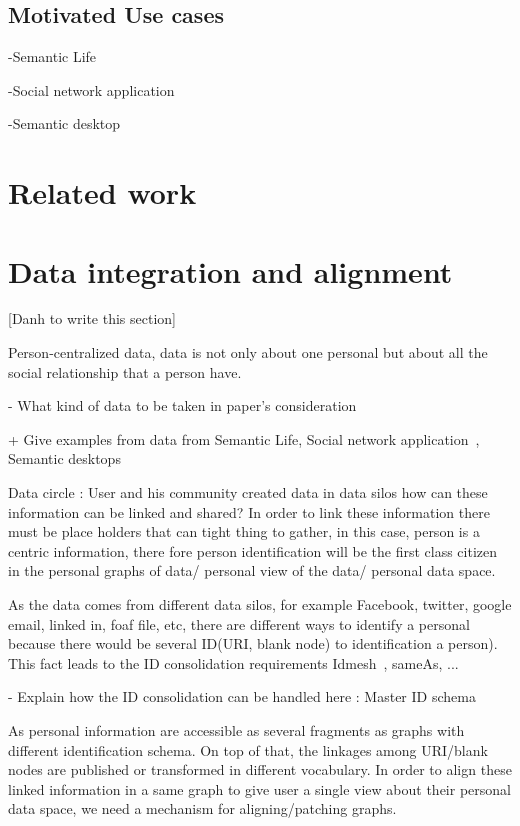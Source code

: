 \documentclass[runningheads,a4paper]{llncs}
\begin{document}
\subsection{Motivated Use cases}

-Semantic Life

-Social network application

-Semantic desktop

\section{Related work}

\section{Data integration and alignment}

[Danh to write this section]

Person-centralized data, data is not only about one personal but about all the social relationship that a person have.

- What kind of data to be taken in paper's consideration

	+ Give examples from data from Semantic Life, Social network application~\cite{Tramp:2010}, Semantic desktops

Data circle : User and his community created data in data silos how can these information can be linked and shared? 
In order to link these information there must be place holders that can tight thing to gather, in this case, person is a centric information,
there fore person identification will be the first class citizen in the personal graphs of data/ personal view of the data/ personal data space. 

As the data comes from different data silos, for example Facebook, twitter, google email, linked in, foaf file, etc, there are different ways to identify 
a personal because there would be several ID(URI, blank node) to identification a person). This fact leads to the  
ID consolidation requirements  Idmesh~\cite{Cudre-Mauroux:2009}, sameAs, ...

- Explain how the ID consolidation can be handled here : Master ID schema


As personal information are accessible as several fragments as graphs with different identification schema. On top of that, the linkages among 
URI/blank nodes are published or transformed in different vocabulary. In order to align these linked information in a same graph to give user a single
view about their personal data space, we need a mechanism for aligning/patching graphs. 
\end{document}

